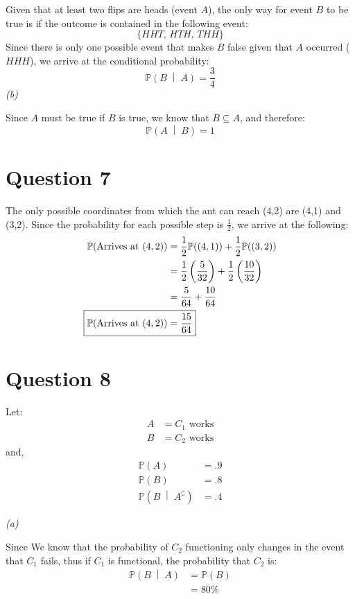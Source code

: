 \documentclass[titlepage, 12pt, leqno]{article}
\begin{document}
Given that at least two flips are heads (event $A$), the only way for event $B$ to be true is if the outcome is contained in the following event:
\[
    \{HHT,\, HTH,\, THH\}
\]
Since there is only one possible event that makes $B$ false given that $A$ occurred ($HHH$), we arrive at the conditional probability:
\[
    \boxed{\mathbb{P}\left(B \;\middle|\; A\right) = \frac{3}{4}}
\]
\textit{(b)}

Since $A$ must be true if $B$ is true, we know that $B \subseteq A$, and therefore:
\[
    \boxed{\mathbb{P}\left(A\;\middle|\;B\right) = 1}
\]
\pagebreak
\section{Question 7}
The only possible coordinates from which the ant can reach (4,2) are (4,1) and (3,2). Since the probability for each possible step is $\frac{1}{2}$, we arrive at the following:
\begin{align*}
    \mathbb{P}(\text{Arrives at }(4,2)) &= \frac{1}{2}\mathbb{P}((4,1)) + \frac{1}{2} \mathbb{P}((3,2)) \\
                                        &= \frac{1}{2} \left(\frac{5}{32}\right) + \frac{1}{2} \left(\frac{10}{32} \right) \\
                                        &= \frac{5}{64} + \frac{10}{64} \\
    \Aboxed{\mathbb{P}(\text{Arrives at } (4,2)) &= \frac{15}{64}}
\end{align*}


\pagebreak
\section{Question 8}
Let:
\begin{align*}
    A &= {C_1 \text{ works}} \\
    B &= {C_2 \text{ works}}
\end{align*}
and,
\begin{align*}
    \mathbb{P}(A) &= .9 \\
    \mathbb{P}(B) &= .8 \\
    \mathbb{P}\left(B \;\middle|\; A^\complement \right) &= .4
\end{align*}

\textit{(a)} 

Since We know that the probability of $C_2$ functioning only changes in the event that $C_1$ fails, thus if $C_1$ is functional, the probability that $C_2$ is:
\begin{align*}
    \mathbb{P}\left(B \;\middle|\; A\right) &= \mathbb{P}(B) \\
                                            &= \boxed{80\%}
\end{align*}
\end{document}
